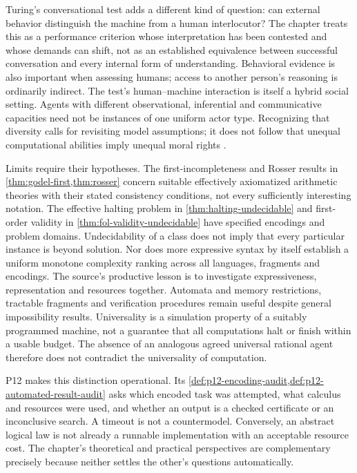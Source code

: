 Turing's conversational test adds a different kind of question: can
external behavior distinguish the machine from a human interlocutor?
The chapter treats this as a performance criterion whose interpretation
has been contested and whose demands can shift, not as an established
equivalence between successful conversation and every internal form of
understanding. Behavioral evidence is also important when assessing
humans; access to another person's reasoning is ordinarily indirect.
The test's human--machine interaction is itself a hybrid social setting.
Agents with different observational, inferential and communicative
capacities need not be instances of one uniform actor type. Recognizing
that diversity calls for revisiting model assumptions; it does not
follow that unequal computational abilities imply unequal moral rights
\cite[p.~187]{VanBenthemLiuSmets2021Logico}.

Limits require their hypotheses. The first-incompleteness and Rosser
results in \cref{thm:godel-first,thm:rosser} concern suitable
effectively axiomatized arithmetic theories with their stated consistency
conditions, not every sufficiently interesting notation. The effective
halting problem in \cref{thm:halting-undecidable} and first-order
validity in \cref{thm:fol-validity-undecidable} have specified encodings
and problem domains. Undecidability of a class does not imply that every
particular instance is beyond solution. Nor does more expressive syntax
by itself establish a uniform monotone complexity ranking across all
languages, fragments and encodings. The source's productive lesson is
to investigate expressiveness, representation and resources together.
Automata and memory restrictions, tractable fragments and verification
procedures remain useful despite general impossibility results.
Universality is a simulation property of a suitably programmed machine,
not a guarantee that all computations halt or finish within a usable
budget. The absence of an analogous agreed universal rational agent
therefore does not contradict the universality of computation.

P12 makes this distinction operational. Its
\cref{def:p12-encoding-audit,def:p12-automated-result-audit} asks which
encoded task was attempted, what calculus and resources were used, and
whether an output is a checked certificate or an inconclusive search.
A timeout is not a countermodel. Conversely, an abstract logical law is
not already a runnable implementation with an acceptable resource cost.
The chapter's theoretical and practical perspectives are complementary
precisely because neither settles the other's questions automatically.

